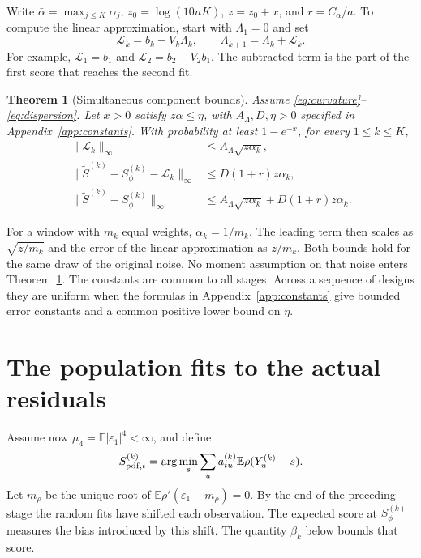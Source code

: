 \documentclass[11pt]{article}
\newcommand{\E}{\mathbb E}
\newcommand{\norm}[1]{\lVert#1\rVert}
\newtheorem{theorem}{Theorem}
\theoremstyle{remark}
\begin{document}
Write \(\bar\alpha=\max_{j\le K}\alpha_j\), \(z_0=\log(10nK)\),
\(z=z_0+x\), and \(r=C_\alpha/a\).
To compute the linear approximation, start with \(\Lambda_1=0\) and set
\begin{equation}
 \mathcal L_k=b_k-V_k\Lambda_k,\qquad
 \Lambda_{k+1}=\Lambda_k+\mathcal L_k. \label{eq:lambda}
\end{equation}
For example, \(\mathcal L_1=b_1\) and \(\mathcal L_2=b_2-V_2b_1\).
The subtracted term is the part of the first score that reaches the second fit.
\begin{theorem}[Simultaneous component bounds]\label{thm:main}
Assume \eqref{eq:curvature}--\eqref{eq:dispersion}.
Let \(x>0\) satisfy \(z\bar\alpha\le\eta\), with
\(A_\Lambda,D,\eta>0\) specified in Appendix~\ref{app:constants}.
With probability at least \(1-e^{-x}\), for every \(1\le k\le K\),
\begin{align}
 \norm{\mathcal L_k}_\infty &\le A_\Lambda\sqrt{z\alpha_k}, \label{eq:L-bound}\\
 \norm{\widetilde S^{(k)}-S_\phi^{(k)}-\mathcal L_k}_\infty
       &\le D(1+r)z\alpha_k, \label{eq:expansion}\\
 \norm{\widetilde S^{(k)}-S_\phi^{(k)}}_\infty
       &\le A_\Lambda\sqrt{z\alpha_k}+D(1+r)z\alpha_k. \label{eq:main}
\end{align}
\end{theorem}
For a window with \(m_k\) equal weights, \(\alpha_k=1/m_k\).
The leading term then scales as \(\sqrt{z/m_k}\) and the error of the
linear approximation as \(z/m_k\). Both bounds hold for the same draw
of the original noise. No moment assumption on that noise enters
Theorem~\ref{thm:main}. The constants are common to all stages. Across a
sequence of designs they are uniform when the formulas in
Appendix~\ref{app:constants} give bounded error constants and a common
positive lower bound on \(\eta\).

\clearpage
\section{The population fits to the actual residuals}\label{sec:targets}
Assume now \(\mu_4=\E|\varepsilon_1|^4<\infty\), and define
\[
 S_{{\rm pdf},t}^{(k)}
       =\arg\min_s\sum_u a_{tu}^{(k)}\E\rho(Y_u^{(k)}-s).
\]
Let \(m_\rho\) be the unique root of
\(\E\rho'(\varepsilon_1-m_\rho)=0\).
By the end of the preceding stage the random fits have shifted each
observation. The expected score at \(S_\phi^{(k)}\) measures the bias
introduced by this shift. The quantity \(\beta_k\) below bounds that score.
\end{document}
